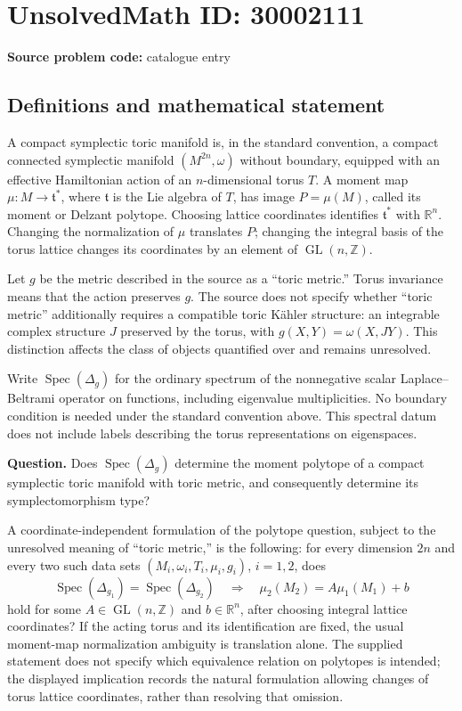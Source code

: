 \documentclass[11pt]{article}
\newcommand{\Z}{\mathbb{Z}}
\newcommand{\R}{\mathbb{R}}
\begin{document}
\section*{UnsolvedMath ID: 30002111}
\textbf{Source problem code:} catalogue entry
\subsection{Definitions and mathematical statement}
A compact symplectic toric manifold is, in the standard convention, a compact connected symplectic manifold \((M^{2n},\omega)\) without boundary, equipped with an effective Hamiltonian action of an \(n\)-dimensional torus \(T\). A moment map \(\mu:M\to\mathfrak t^*\), where \(\mathfrak t\) is the Lie algebra of \(T\), has image \(P=\mu(M)\), called its moment or Delzant polytope. Choosing lattice coordinates identifies \(\mathfrak t^*\) with \(\R^n\). Changing the normalization of \(\mu\) translates \(P\); changing the integral basis of the torus lattice changes its coordinates by an element of \(\operatorname{GL}(n,\Z)\).

Let \(g\) be the metric described in the source as a ``toric metric.'' Torus invariance means that the action preserves \(g\). The source does not specify whether ``toric metric'' additionally requires a compatible toric K\"ahler structure: an integrable complex structure \(J\) preserved by the torus, with \(g(X,Y)=\omega(X,JY)\). This distinction affects the class of objects quantified over and remains unresolved.

Write \(\operatorname{Spec}(\Delta_g)\) for the ordinary spectrum of the nonnegative scalar Laplace--Beltrami operator on functions, including eigenvalue multiplicities. No boundary condition is needed under the standard convention above. This spectral datum does not include labels describing the torus representations on eigenspaces.

\textbf{Question.} Does \(\operatorname{Spec}(\Delta_g)\) determine the moment polytope of a compact symplectic toric manifold with toric metric, and consequently determine its symplectomorphism type?

A coordinate-independent formulation of the polytope question, subject to the unresolved meaning of ``toric metric,'' is the following: for every dimension \(2n\) and every two such data sets \((M_i,\omega_i,T_i,\mu_i,g_i)\), \(i=1,2\), does
\[
\operatorname{Spec}(\Delta_{g_1})=\operatorname{Spec}(\Delta_{g_2})
\quad\Longrightarrow\quad
\mu_2(M_2)=A\mu_1(M_1)+b
\]
hold for some \(A\in\operatorname{GL}(n,\Z)\) and \(b\in\R^n\), after choosing integral lattice coordinates? If the acting torus and its identification are fixed, the usual moment-map normalization ambiguity is translation alone. The supplied statement does not specify which equivalence relation on polytopes is intended; the displayed implication records the natural formulation allowing changes of torus lattice coordinates, rather than resolving that omission.
\end{document}
